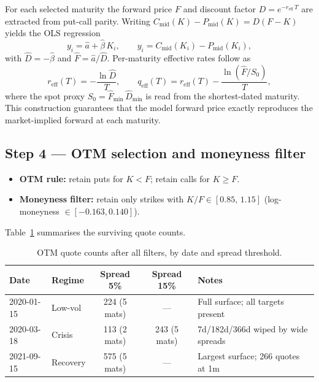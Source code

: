 \documentclass[11pt,a4paper]{article}
\begin{document}
For each selected maturity the forward price $F$ and discount factor
$D = e^{-r_{\text{eff}}\,T}$ are extracted from put-call parity.
Writing $C_\text{mid}(K) - P_\text{mid}(K) = D(F - K)$ yields the OLS
regression
\[
  y_i = \hat a + \hat\beta\,K_i,
  \qquad
  y_i = C_\text{mid}(K_i) - P_\text{mid}(K_i),
\]
with $\hat D = -\hat\beta$ and $\hat F = \hat a / \hat D$.
Per-maturity effective rates follow as
\begin{equation}
  r_{\text{eff}}(T) = -\frac{\ln \hat D}{T}, \qquad
  q_{\text{eff}}(T) = r_{\text{eff}}(T) - \frac{\ln(\hat F / S_0)}{T},
  \label{eq:rates}
\end{equation}
where the spot proxy $S_0 = \hat F_{\min}\,\hat D_{\min}$ is read from the
shortest-dated maturity.  This construction guarantees that the model
forward price exactly reproduces the market-implied forward at each maturity.

\subsection{Step 4 — OTM selection and moneyness filter}

\begin{itemize}[noitemsep]
  \item \textbf{OTM rule:} retain puts for $K < F$; retain calls for $K \ge F$.
  \item \textbf{Moneyness filter:} retain only strikes with
        $K/F \in [0.85,\, 1.15]$ (log-moneyness $\in [-0.163, 0.140]$).
\end{itemize}

Table~\ref{tab:quote_counts} summarises the surviving quote counts.

\begin{table}[ht]
\centering
\caption{OTM quote counts after all filters, by date and spread threshold.}
\label{tab:quote_counts}
\begin{tabular}{llccl}
\toprule
Date & Regime & Spread 5\% & Spread 15\% & Notes \\
\midrule
2020-01-15 & Low-vol  & 224 (5 mats) & —    & Full surface; all targets present \\
2020-03-18 & Crisis   & 113 (2 mats) & 243 (5 mats) & 7d/182d/366d wiped by wide spreads \\
2021-09-15 & Recovery & 575 (5 mats) & —    & Largest surface; 266 quotes at 1m \\
\bottomrule
\end{tabular}
\end{table}
\end{document}
